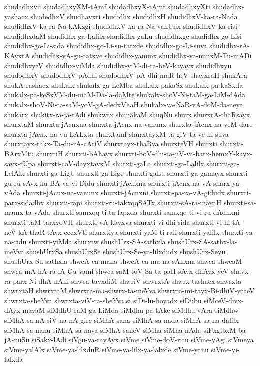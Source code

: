 {shudadhxvu
shudadhxyXM-tAmf
shudadhxyX-tAmf
shudadhxyXti
shudadhx-yashacx
shudedhxV
shudhayxti
shudidhx
shudidhxH
shudidhxV-ka-ra-Nada
shudidhxV-ka-ra-Na-kAkxgi
shudidhxV-ka-ra-Na-vanUnx
shudidhxV-ka-risi
shudidhxdaM
shudidhx-ga-Lalilx
shudidhx-gaLu
shudidhxge
shudidhx-go-Lisi
shudidhx-go-Li-sida
shudidhx-go-Li-su-tatxde
shudidhx-go-Li-suva
shudidhx-rA-KAyxtA
shudidhx-yA-gu-tatxve
shudidhx-yanunx
shudidhx-ya-nunxM-Tu-mADi
shudidhxyeV
shudidhx-yiMda
shudidhx-yiM-di-ra-beV-kayayx
shudidhxyu
shudodhxV
shudodhxV-pAdhi
shudodhxV-pA-dhi-maR-heV-shavxraH
shukAra
shukA-rashacx
shukalx
shukalx-ga-LeMba
shukalx-pakaSx
shukalx-pa-kaSxda
shukalx-pa-keSxVM-du-maM-Da-la-daMte
shukalx-shoV-Ni-taM-ga-LiM-dAda
shukalx-shoV-Ni-ta-saM-yoV-gA-dedxVhaH
shukalx-va-NaR-vA-doM-da-neya
shukarx
shukitx-ra-ja-tAdi
shukwtx
shunakaM
shuqNu
shurx
shurxtA-thaRsayx
shurxtaM
shurxta-jAcnxna
shurxta-jAcnx-na-vanunx
shurxta-jAcnx-na-veM-dare
shurxta-jAcnx-na-vu-LALxta
shurxtamf
shurxtayxM-ta-giV-ta-ve-ni-suva
shurxtayx-takx-Ta-du-rA-cAriV
shurxtayx-thaRva
shurxteVH
shurxti
shurxti-BArxMtu
shurxtiH
shurxti-bAhayx
shurxti-boV-dhi-ta-jiV-va-barx-hemxY-kayx-savx-rUpa
shurxti-coV-dayxtavxM
shurxti-gaLa
shurxti-ga-Lalilx
shurxti-ga-LelAlx
shurxti-ga-LigU
shurxti-ga-Lige
shurxti-gaLu
shurxti-ga-gamayx
shurxti-gu-ru-sAvx-nu-BA-va-vi-Didu
shurxti-jAcnxna
shurxti-jAcnx-na-vA-sharx-ya-vAda
shurxti-jAcnx-na-vanunx
shurxti-jAcnxni
shurxti-pa-ra-vA-gidudx
shurxti-parx-sidadhx
shurxti-rapi
shurxti-ru-takxqqSATx
shurxti-sA-ra-mayaH
shurxti-sa-mamx-ta-vAda
shurxti-samxqq-ti-ta-lapxda
shurxti-samxqq-ti-vi-ru-dAdhxni
shurxti-taM-tarxyoVH
shurxti-vA-kayxva
shurxti-vi-dhi-sida
shurxti-vi-hi-tA-neV-kA-thaR-tAvx-cecxVti
shurxtiya
shurxti-yaM-ti-rali
shurxti-yalilx
shurxti-ya-na-ridu
shurxti-yiMda
shurxtw
shushUrx-SA-sathxla
shushUrx-SA-sathx-la-meVva
shushUrxSa
shushUrxSe
shushUrx-Se-ya-lilxdudx
shushUrx-Seyu
shushUrx-Su-sathxla
shwcA-ca-mana
shwcA-ca-ma-na-sAnxna
shwca
shwcaM
shwca-mA-hA-ra-lA-Ga-vamf
shwca-saM-toV-Sa-ta-paH-sAvx-dhAyx-yeV-shavx-ra-parx-Ni-dhA-nAni
shwca-tavxdiM
shwriV
shwrxtA-shwrx-tashacx
shwrxta
shwrxtaH
shwrxtaM
shwrxta-ma-shwrx-ta-meVva
shwrxta-mi-tayx-Bi-dhiV-yateV
shwrxta-sheYva
shwrxta-viV-ra-sheYva
si
siDi-lu-hoyadx
siDubu
siMceV-divx-dAyx-mayaM
siMdhU-raM-ga-LiMda
siMdhu-pa-tAke
siMdhu-vAra
siMdhw
siMhA-sa-nA-siV-na-nA-gire
siMhA-sana
siMhA-sa-nada
siMhA-sa-na-dalilx
siMhA-sa-nanu
siMhA-sa-nava
siMhA-saneV
siMha
siMha-nAda
siPxgibxM-ba-jA-nuSu
siSakx-lAdi
siVgu-va-rayAyx
siVme
siVme-doV-ritu
siVme-yAgi
siVmeya
siVme-yalAlx
siVme-ya-lilxduR
siVme-ya-lilx-ya-lalxde
siVme-yanu
siVme-yi-lalxda
}
